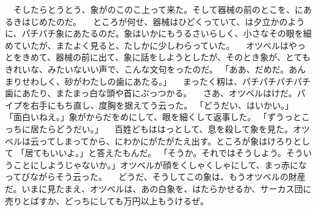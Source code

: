 　そしたらとうとう、象がのこのこ上って来た。そして器械の前のとこを、にあるきはじめたのだ。
　ところが何せ、器械はひどくっていて、は夕立かのように、パチパチ象にあたるのだ。象はいかにもうるさいらしく、小さなその眼を細めていたが、またよく見ると、たしかに少しわらっていた。
　オツベルはやっとをきめて、器械の前に出て、象に話をしようとしたが、そのとき象が、とてもきれいな、みたいないい声で、こんな文句をったのだ。
「ああ、だめだ。あんまりせわしく、砂がわたしの歯にあたる。」
　まったく籾は、パチパチパチパチ歯にあたり、またまっ白な頭や首にぶっつかる。
　さあ、オツベルはけだ。パイプを右手にもち直し、度胸を据えてう云った。
「どうだい、はいかい。」
「面白いねえ。」象がからだをめにして、眼を細くして返事した。
「ずうっとこっちに居たらどうだい。」
　百姓どもははっとして、息を殺して象を見た。オツベルは云ってしまってから、にわかにがたがたえ出す。ところが象はけろりとして
「居てもいいよ。」と答えたもんだ。
「そうか。それではそうしよう。そういうことにしようじゃないか。」オツベルが顔をくしゃくしゃにして、まっ赤になってびながらそう云った。
　どうだ、そうしてこの象は、もうオツベルの財産だ。いまに見たまえ、オツベルは、あの白象を、はたらかせるか、サーカス団に売りとばすか、どっちにしても万円以上もうけるぜ。
　
